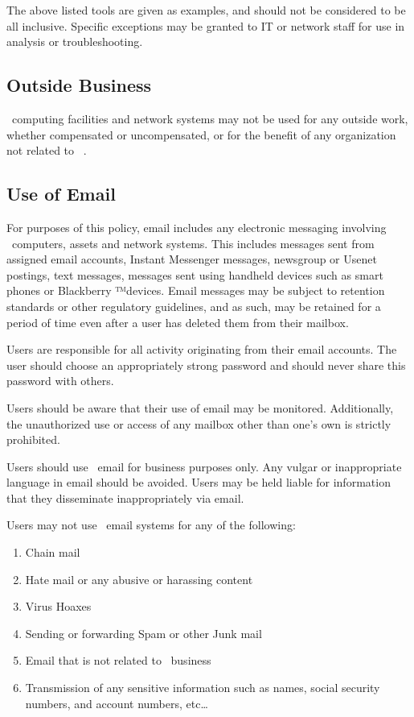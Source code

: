 \documentclass[use]{policy}
\begin{document}
			The above listed tools are given as examples, and should not be considered to be all inclusive.  Specific exceptions may be granted to IT or network staff for use in analysis or troubleshooting.
		
		\subsection{Outside Business}
			\theOrganization\  computing facilities and network systems may not be used for any outside work, whether compensated or uncompensated, or for the benefit of any organization not related to \theOrganization\ . 
	
		\subsection{Use of Email}
			For purposes of this policy, email includes any electronic messaging involving \theOrganization\  computers, assets and network systems.  This includes messages sent from assigned email accounts, Instant Messenger messages, newsgroup or Usenet postings, text messages, messages sent using handheld devices such as smart phones or Blackberry ™devices.  Email messages may be subject to retention standards or other regulatory guidelines, and as such, may be retained for a period of time even after a user has deleted them from their mailbox.
			
			Users are responsible for all activity originating from their email accounts.  The user should choose an appropriately strong password and should never share this password with others.
			
			Users should be aware that their use of email may be monitored.  Additionally, the unauthorized use or access of any mailbox other than one’s own is strictly prohibited.
			
			Users should use \theOrganization\  email for business purposes only.  Any vulgar or inappropriate language in email should be avoided.  Users may be held liable for information that they disseminate inappropriately via email.
			
			Users may not use \theOrganization\  email systems for any of the following:
			\begin{enumerate}[label=\alph*)]
				\item Chain mail
				\item Hate mail or any abusive or harassing content
				\item Virus Hoaxes
				\item Sending or forwarding Spam or other Junk mail
				\item Email that is not related to \theOrganization\  business
				\item Transmission of any sensitive information such as names, social security numbers, and account numbers, etc…
			\end{enumerate}
		
\end{document}
